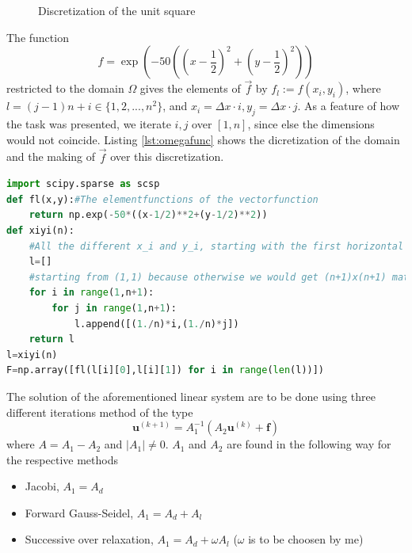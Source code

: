 \documentclass[12pt, a4paper,usenames,dvipsnames]{article}
\renewcommand\vec{\mathbf}
\begin{document}
\begin{figure}[h!]
    \centering
    \caption{Discretization of the unit square}
    \label{fig:omega}
\end{figure}
The function
\[f=\exp{(-50(\left(x-\frac{1}{2}\right)^2+\left(y-\frac{1}{2}\right)^2))}\]
restricted to the domain \(\Omega\) gives the elements of \(\Vec{f}\) by \(f_l:=f(x_i,y_i)\), where \(l= (j-1) n + i\in\{1,2,...,n^2\}\), and \(x_i=\Delta x\cdot i,y_j=\Delta x\cdot j\). As a feature of how the task was presented, we iterate \(i,j\) over \([1,n]\), since else the dimensions would not coincide. Listing \ref{lst:omegafunc} shows the dicretization of the domain and the making of \(\Vec{f}\) over this discretization.
\begin{lstlisting}[language=python,caption=The discretization of \(\Omega\) and the making of \(\Vec{f}\),label=lst:omegafunc]
import scipy.sparse as scsp
def fl(x,y):#The elementfunctions of the vectorfunction
    return np.exp(-50*((x-1/2)**2+(y-1/2)**2))
def xiyi(n):
    #All the different x_i and y_i, starting with the first horizontal column
    l=[]
    #starting from (1,1) because otherwise we would get (n+1)x(n+1) matrices
    for i in range(1,n+1):
        for j in range(1,n+1):
            l.append([(1./n)*i,(1./n)*j])
    return l
l=xiyi(n)
F=np.array([fl(l[i][0],l[i][1]) for i in range(len(l))])
\end{lstlisting}
The solution of the aforementioned linear system are to be done using three different iterations method of the type
\[\vec{u}^{(k+1)}=A_1^{-1}(A_2\vec{u}^{(k)}+\vec{f})\]
where \(A=A_1-A_2\) and \(|A_1|\not=0\). \(A_1\) and \(A_2\) are found in the following way for the respective methods
\begin{itemize}
    \item Jacobi, \(A_1=A_d\)
    \item Forward Gauss-Seidel, \(A_1=A_d+A_l\)
    \item Successive over relaxation, \(A_1=A_d+\omega A_l\) (\(\omega\) is to be choosen by me)
\end{itemize}
\end{document}
